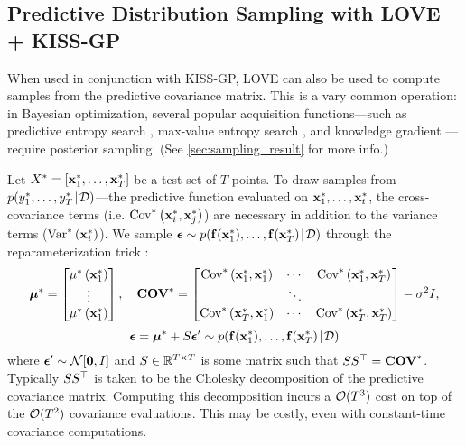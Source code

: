 \subsection{Predictive Distribution Sampling with LOVE{} + KISS-GP}
\label{sec:sampling_method}

When used in conjunction with KISS-GP, LOVE{} can also be used to compute samples from the predictive covariance matrix.
This is a vary common operation: in Bayesian optimization, several popular acquisition functions---such as predictive entropy search \cite{hernandez2014predictive}, max-value entropy search \cite{wang2017max}, and knowledge gradient \cite{frazier2009knowledge}---require posterior sampling.
(See \cref{sec:sampling_result} for more info.)

Let $X^* = [ \mathbf{x}^*_1, \ldots, \mathbf{x}^*_T ]$ be a test set of $T$ points.
To draw samples from $p( y^*_1, \ldots, y^*_T  \! \mid \! \mathcal D)$---the predictive function evaluated on $\mathbf{x}^*_1, \ldots, \mathbf{x}^*_t$,
the cross-covariance terms (i.e. $\text{Cov}^* \left( \mathbf{x}^*_i, \mathbf{x}^*_j \right)$) are necessary in addition to the variance terms ($\text{Var}^* \left( \mathbf{x}^*_i \right)$).
We sample $\boldsymbol{\epsilon} \sim p( \mathbf{f}(\mathbf{x}^*_1), \ldots, \mathbf{f}(\mathbf{x}^*_T) \! \mid \! \mathcal D)$ through the reparameterization trick \cite{kingma2014auto,rezende2014stochastic}:
%
\[
  \boldsymbol{\mu}^* = \begin{bmatrix} \mu^* \left( \mathbf{x}^*_1 \right) \\ \vdots \\ \mu^* \left( \mathbf{x}^*_1 \right) \end{bmatrix},
  \quad
  \textbf{COV}^* = \begin{bmatrix}
    \text{Cov}^* \left( \mathbf{x}^*_1, \mathbf{x}^*_1 \right) & \cdots & \text{Cov}^* \left( \mathbf{x}^*_1, \mathbf{x}^*_T \right) \\
    & \ddots & \\
    \text{Cov}^* \left( \mathbf{x}^*_T, \mathbf{x}^*_1 \right) & \cdots & \text{Cov}^* \left( \mathbf{x}^*_T, \mathbf{x}^*_T \right) \\
  \end{bmatrix} - \sigma^2 I,
\]
\begin{equation}
  \boldsymbol{\epsilon} = \boldsymbol{\mu}^* + S \boldsymbol{\epsilon}' \sim p( \mathbf{f}(\mathbf{x}^*_1), \ldots, \mathbf{f}(\mathbf{x}^*_T) \! \mid \! \mathcal D)
  \label{eqn:sample}
\end{equation}
%
where $\bepsilon' \sim \normaldist{\bzero}{\bI}$ and $S \in \mathbb{R}^{T \times T}$ is some matrix such that $S S^\top = \textbf{COV}^*$.
Typically $S S^\top$ is taken to be the Cholesky decomposition of the predictive covariance matrix.
Computing this decomposition incurs a $\bigo{T^3}$ cost on top of the $\bigo{T^2}$ covariance evaluations.
This may be costly, even with constant-time covariance computations.

